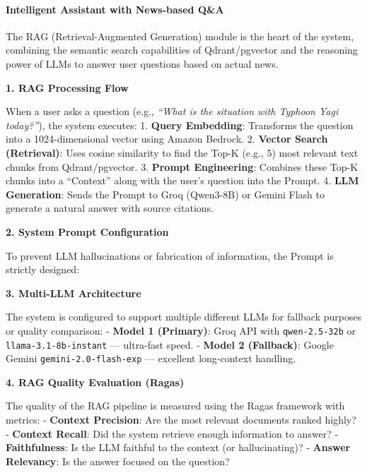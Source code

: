 \hypertarget{intelligent-assistant-with-news-based-qa}{%
\paragraph{Intelligent Assistant with News-based
Q\&A}}

The RAG (Retrieval-Augmented Generation) module is the heart of the
system, combining the semantic search capabilities of Qdrant/pgvector
and the reasoning power of LLMs to answer user questions based on actual
news.

\textbf{1. RAG Processing Flow}

When a user asks a question (e.g., \emph{``What is the situation with
Typhoon Yagi today?''}), the system executes: 1. \textbf{Query
Embedding}: Transforms the question into a 1024-dimensional vector using
Amazon Bedrock. 2. \textbf{Vector Search (Retrieval)}: Uses cosine
similarity to find the Top-K (e.g., 5) most relevant text chunks from
Qdrant/pgvector. 3. \textbf{Prompt Engineering}: Combines these Top-K
chunks into a ``Context'' along with the user's question into the
Prompt. 4. \textbf{LLM Generation}: Sends the Prompt to Groq (Qwen3-8B)
or Gemini Flash to generate a natural answer with source citations.

\textbf{2. System Prompt Configuration}

To prevent LLM hallucinations or fabrication of information, the Prompt
is strictly designed:

\begin{Shaded}
\begin{Highlighting}[]
\OperatorTok{=} 
\end{Highlighting}
\end{Shaded}

\textbf{3. Multi-LLM Architecture}

The system is configured to support multiple different LLMs for fallback
purposes or quality comparison: - \textbf{Model 1 (Primary)}: Groq API
with \texttt{qwen-2.5-32b} or \texttt{llama-3.1-8b-instant} ---
ultra-fast speed. - \textbf{Model 2 (Fallback)}: Google Gemini
\texttt{gemini-2.0-flash-exp} --- excellent long-context handling.

\textbf{4. RAG Quality Evaluation (Ragas)}

The quality of the RAG pipeline is measured using the Ragas framework
with metrics: - \textbf{Context Precision}: Are the most relevant
documents ranked highly? - \textbf{Context Recall}: Did the system
retrieve enough information to answer? - \textbf{Faithfulness}: Is the
LLM faithful to the context (or hallucinating)? - \textbf{Answer
Relevancy}: Is the answer focused on the question?
